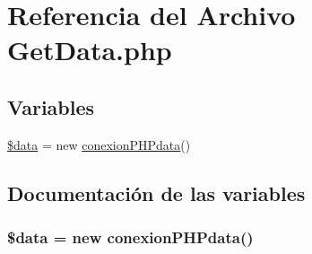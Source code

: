 \hypertarget{GetData_8php}{\section{Referencia del Archivo Get\-Data.\-php}
\label{GetData_8php}
}
\subsection*{Variables}
\begin{DoxyCompactItemize}
\item 
\hyperlink{GetData_8php_a6efc15b5a2314dd4b5aaa556a375c6d6}{\$data} = new \hyperlink{classconexionPHPdata}{conexion\-P\-H\-Pdata}()
\end{DoxyCompactItemize}


\subsection{Documentación de las variables}
\hypertarget{GetData_8php_a6efc15b5a2314dd4b5aaa556a375c6d6}{
\subsubsection[{\$data}]{\setlength{\rightskip}{0pt plus 5cm}\$data = new {\bf conexion\-P\-H\-Pdata}()}}\label{GetData_8php_a6efc15b5a2314dd4b5aaa556a375c6d6}
